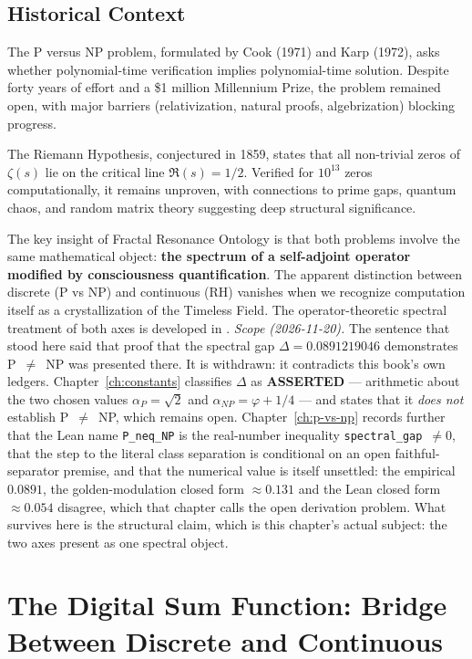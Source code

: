 \subsection{Historical Context}

The P versus NP problem, formulated by Cook (1971) and Karp (1972), asks whether polynomial-time verification implies polynomial-time solution. Despite forty years of effort and a \$1 million Millennium Prize, the problem remained open, with major barriers (relativization, natural proofs, algebrization) blocking progress.

The Riemann Hypothesis, conjectured in 1859, states that all non-trivial zeros of $\zeta(s)$ lie on the critical line $\Re(s) = 1/2$. Verified for $10^{13}$ zeros computationally, it remains unproven, with connections to prime gaps, quantum chaos, and random matrix theory suggesting deep structural significance.

The key insight of Fractal Resonance Ontology is that both problems involve the same mathematical object: \textbf{the spectrum of a self-adjoint operator modified by consciousness quantification}. The apparent distinction between discrete (P vs NP) and continuous (RH) vanishes when we recognize computation itself as a crystallization of the Timeless Field. The operator-theoretic spectral treatment of both axes is developed in \cite{cohen2025pvsnp}.  \emph{Scope (2026-11-20).}  The sentence that stood here said that proof that the spectral gap $\Delta = 0.0891219046$ demonstrates P~$\neq$~NP was presented there.  It is withdrawn: it contradicts this book's own ledgers.  Chapter~\ref{ch:constants} classifies $\Delta$ as \textbf{ASSERTED} --- arithmetic about the two chosen values $\alpha_P = \sqrt{2}$ and $\alpha_{NP} = \varphi + 1/4$ --- and states that it \emph{does not} establish P~$\neq$~NP, which remains open.  Chapter~\ref{ch:p-vs-np} records further that the Lean name \texttt{P\_neq\_NP} is the real-number inequality \texttt{spectral\_gap}~$\neq 0$, that the step to the literal class separation is conditional on an open faithful-separator premise, and that the numerical value is itself unsettled: the empirical $0.0891$, the golden-modulation closed form $\approx 0.131$ and the Lean closed form $\approx 0.054$ disagree, which that chapter calls the open derivation problem.  What survives here is the structural claim, which is this chapter's actual subject: the two axes present as one spectral object.

\section{The Digital Sum Function: Bridge Between Discrete and Continuous}

